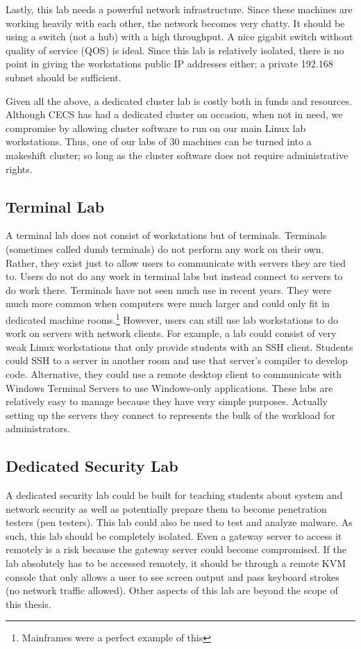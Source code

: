 Lastly, this lab needs a powerful network infrastructure.  Since these machines are working heavily with each other, the network becomes very chatty.  It should be using a switch (not a hub) with a high throughput.  A nice gigabit switch without quality of service (QOS) is ideal.  Since this lab is relatively isolated, there is no point in giving the workstations public IP addresses either; a private 192.168 subnet should be sufficient. 

Given all the above, a dedicated cluster lab is costly both in funds and resources.  Although CECS has had a dedicated cluster on occasion, when not in need, we compromise by allowing cluster software to run on our main Linux lab workstations.  Thus, one of our labs of 30 machines can be turned into a makeshift cluster; so long as the cluster software does not require administrative rights.  

\subsection{Terminal Lab}
A terminal lab does not consist of workstations but of terminals.  Terminals (sometimes called dumb terminals) do not perform any work on their own.   Rather, they exist just to allow users to communicate with servers they are tied to.  Users do not do any work in terminal labs but instead connect to servers to do work there.  Terminals have not seen much use in recent years.  They were much more common when computers were much larger and could only fit in dedicated machine rooms.\footnote{Mainframes were a perfect example of this}  However, users can still use lab workstations to do work on servers with network clients.  For example, a lab could consist of very weak Linux workstations that only provide students with an SSH client.  Students could SSH to a server in another room and use that server's compiler to develop code.  Alternative, they could use a remote desktop client to communicate with Windows Terminal Servers to use Windows-only applications.  These labs are relatively easy to manage because they have very simple purposes.  Actually setting up the servers they connect to represents the bulk of the workload for administrators.  
\subsection{Dedicated Security Lab}
A dedicated security lab could be built for teaching students about system and network security as well as potentially prepare them to become penetration testers (pen testers).  This lab could also be used to test and analyze malware.  As such, this lab should be completely isolated.  Even a gateway server to access it remotely is a risk because the gateway server could become compromised.  If the lab absolutely has to be accessed remotely, it should be through a remote KVM console that only allows a user to see screen output and pass keyboard strokes (no network traffic allowed).  Other aspects of this lab are beyond the scope of this thesis.  
